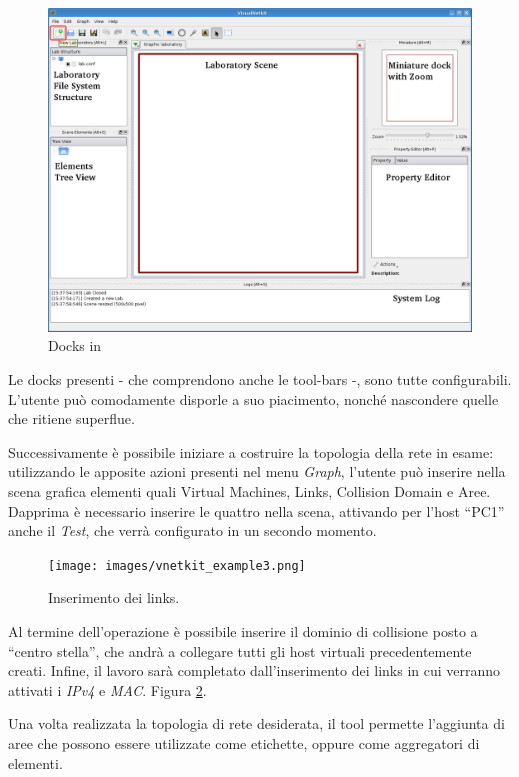 \begin{figure}[!htb]
	\centering
	\includegraphics[width=12.5cm]{images/vnetkit_example1.png}
	\caption{Docks in \visualnetkit{}}
	\label{figura:vn_ex_dock}
\end{figure}

Le docks presenti - che comprendono anche le tool-bars -, sono tutte configurabili. L'utente può comodamente disporle a suo piacimento, nonché nascondere quelle che ritiene superflue.

Successivamente è possibile iniziare a costruire la topologia della rete in esame: utilizzando le apposite azioni presenti nel menu \emph{Graph}, l'utente può inserire nella scena grafica elementi quali Virtual Machines, Links, Collision Domain e Aree. Dapprima è necessario inserire le quattro \virtualmachine{} nella scena, attivando per l'host ``PC1'' anche il \plugin{} \emph{Test}, che verrà configurato in un secondo momento.

\begin{figure}[!htb]
	\centering
	\texttt{[image: images/vnetkit\_example3.png]}
	\caption{Inserimento dei links.}
	\label{figura:vn_ex_links}
\end{figure}

Al termine dell'operazione è possibile inserire il dominio di collisione posto a ``centro stella'', che andrà a collegare tutti gli host virtuali precedentemente creati. Infine, il lavoro sarà completato dall'inserimento dei links in cui verranno attivati i \plugin{} \emph{IPv4} e \emph{MAC}. Figura \ref{figura:vn_ex_links}.

Una volta realizzata la topologia di rete desiderata, il tool permette l'aggiunta di aree che possono essere utilizzate come etichette, oppure come aggregatori di elementi.

